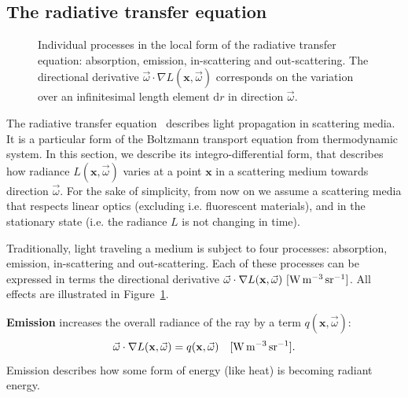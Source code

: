 \subsection{The radiative transfer equation}
\label{sec:radiativetransfer}
\begin{figure}
\centering
{}
\caption{Individual processes in the local form of the radiative transfer equation: absorption, emission, in-scattering and out-scattering. The directional derivative $\vec{\omega} \cdot \nabla L(\mathbf{x}, \vec{\omega})$ corresponds on the variation over an infinitesimal length element $\text{d}r$ in direction $\vec{\omega}$. } 
\label{fig:rte_elements}
\end{figure}
The radiative transfer equation~\cite{Chandrasekhar1950} describes light propagation in scattering media. It is a particular form of the Boltzmann transport equation from thermodynamic system. In this section, we describe its integro-differential form, that describes how radiance $L(\mathbf{x}, \vec{\omega})$ varies at a point $\mathbf{x}$ in a scattering medium towards direction $\vec{\omega}$. For the sake of simplicity, from now on we assume a scattering media that respects linear optics (excluding i.e. fluorescent materials), and in the stationary state (i.e. the radiance $L$ is not changing in time). 

Traditionally, light traveling a medium is subject to four processes: absorption, emission, in-scattering and out-scattering. Each of these processes can be expressed in terms the directional derivative $\vec{\omega} \cdot \nabla L(\mathbf{x}, \vec{\omega})  \ \siunitnospace{\watt \per \cubic \metre \per \steradian}$. All effects are illustrated in Figure~\ref{fig:rte_elements}.

\textbf{Emission} increases the overall radiance of the ray by a term $q(\mathbf{x}, \vec{\omega})$:
\begin{equation*}
\vec{\omega} \cdot \nabla L(\mathbf{x}, \vec{\omega}) = q(\mathbf{x}, \vec{\omega}) \siunit{\watt \per \cubic \metre \per \steradian}.
\end{equation*} 
Emission describes how some form of energy (like heat) is becoming radiant energy.

